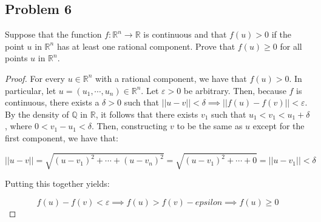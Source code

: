 \documentclass{article}
\begin{document}
\subsection*{Problem 6}
Suppose that the function $f \colon \mathbb{R}^n \to \mathbb{R}$ is continuous and that $f(u) > 0$ if the point $u$ in $\mathbb{R}^n$ has at least one rational component. Prove that $f(u) \geq 0$ for all points $u$ in $\mathbb{R}^n$.

\begin{proof}

For every $u \in \mathbb{R}^n$ with a rational component, we have that $f(u) > 0$. In particular, let $u = (u_1, \cdots, u_n) \in \mathbb{R}^n$. Let $\varepsilon > 0$ be arbitrary. Then, because $f$ is continuous, there exists a $\delta > 0$ such that $||u - v|| < \delta \implies ||f(u) - f(v)|| < \varepsilon$. By the density of $\mathbb{Q}$ in $\mathbb{R}$, it follows that there exists $v_1$ such that $u_1 < v_1 < u_1 + \delta$, where $0 < v_1 - u_1 < \delta$. Then, constructing $v$ to be the same as $u$ except for the first component, we have that:

\[ ||u-v|| = \sqrt{(u-v_1)^2 + \cdots + (u - v_n)^2} = \sqrt{(u-v_1)^2 + \cdots + 0} = ||u-v_1|| < \delta\]

Putting this together yields:

\[ f(u) - f(v) < \varepsilon \implies f(u) > f(v) - epsilon \implies f(u) \geq 0\]

\end{proof}
\end{document}
